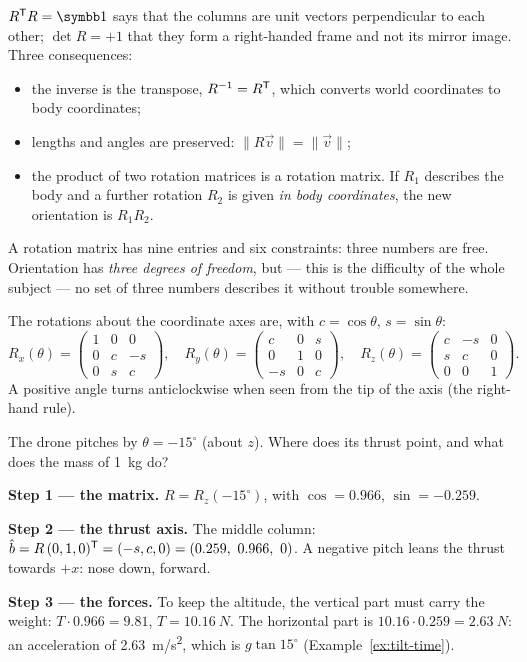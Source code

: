 $R^\T R = \Id$ says that the columns are unit vectors perpendicular to each other; $\det R = +1$ that they form a right-handed frame and not its mirror image. Three consequences:
\begin{itemize}
  \item the inverse is the transpose, $R^{-1} = R^{\mathsf{T}}$, which converts world coordinates to body coordinates;
  \item lengths and angles are preserved: $\|R\vec v\| = \|\vec v\|$;
  \item the product of two rotation matrices is a rotation matrix. If $R_1$ describes the body and a further rotation $R_2$ is given \emph{in body coordinates}, the new orientation is $R_1R_2$.
\end{itemize}
A rotation matrix has nine entries and six constraints: three numbers are free. Orientation has \emph{three degrees of freedom}, but — this is the difficulty of the whole subject — no set of three numbers describes it without trouble somewhere.

The rotations about the coordinate axes are, with $c = \cos\theta$, $s = \sin\theta$:
\begin{equation}\label{eq:H-elementary}
  R_x(\theta) = \begin{pmatrix}1 & 0 & 0\\ 0 & c & -s\\ 0 & s & c\end{pmatrix}, \quad
  R_y(\theta) = \begin{pmatrix}c & 0 & s\\ 0 & 1 & 0\\ -s & 0 & c\end{pmatrix}, \quad
  R_z(\theta) = \begin{pmatrix}c & -s & 0\\ s & c & 0\\ 0 & 0 & 1\end{pmatrix} .
\end{equation}
A positive angle turns anticlockwise when seen from the tip of the axis (the right-hand rule).

\begin{example}
\label{ex:H-thrust}
The drone pitches by $\theta = -15^\circ$ (about $z$). Where does its thrust point, and what does the mass of \SI{1}{kg} do?

\textbf{Step 1 — the matrix.} $R = R_z(-15^\circ)$, with $\cos = 0.966$, $\sin = -0.259$.

\textbf{Step 2 — the thrust axis.} The middle column: $\hat b = R\,(0, 1, 0)^\T = (-s, c, 0) = (0.259,\ 0.966,\ 0)$. A negative pitch leans the thrust towards $+x$: nose down, forward.

\textbf{Step 3 — the forces.} To keep the altitude, the vertical part must carry the weight: $T \cdot 0.966 = 9.81$, $T = \SI{10.16}{N}$. The horizontal part is $10.16 \cdot 0.259 = \SI{2.63}{N}$: an acceleration of \SI{2.63}{m/s^2}, which is $g\tan 15^\circ$ (Example~\ref{ex:tilt-time}).
\end{example}

